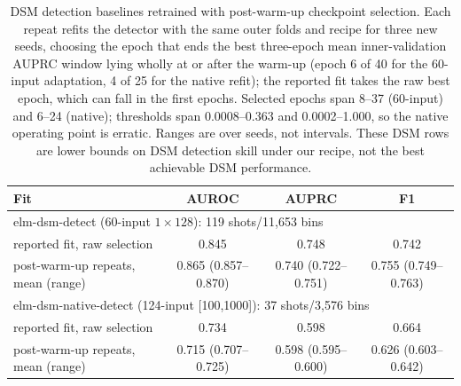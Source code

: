 \begin{table}[t]
\centering
\small
\begin{tabular}{lccc}
\toprule
Fit & AUROC & AUPRC & F1 \\
\midrule
\multicolumn{4}{l}{elm-dsm-detect (60-input $1\times128$): 119 shots/11,653 bins} \\
reported fit, raw selection & 0.845 & 0.748 & 0.742 \\
post-warm-up repeats, mean (range) & 0.865 (0.857--0.870) & 0.740 (0.722--0.751) & 0.755 (0.749--0.763) \\
\midrule
\multicolumn{4}{l}{elm-dsm-native-detect (124-input [100,1000]): 37 shots/3,576 bins} \\
reported fit, raw selection & 0.734 & 0.598 & 0.664 \\
post-warm-up repeats, mean (range) & 0.715 (0.707--0.725) & 0.598 (0.595--0.600) & 0.626 (0.603--0.642) \\
\bottomrule
\end{tabular}\caption{DSM detection baselines retrained with post-warm-up checkpoint selection. Each repeat refits the detector with the same outer folds and recipe for three new seeds, choosing the epoch that ends the best three-epoch mean inner-validation AUPRC window lying wholly at or after the warm-up (epoch 6 of 40 for the 60-input adaptation, 4 of 25 for the native refit); the reported fit takes the raw best epoch, which can fall in the first epochs. Selected epochs span 8--37 (60-input) and 6--24 (native); thresholds span 0.0008--0.363 and 0.0002--1.000, so the native operating point is erratic. Ranges are over seeds, not intervals. These DSM rows are lower bounds on DSM detection skill under our recipe, not the best achievable DSM performance.}
\label{tab:elm-dsm-repeats}
\end{table}
